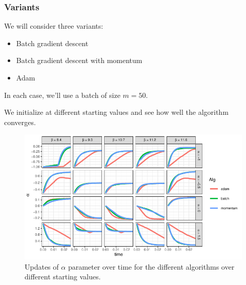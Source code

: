 \documentclass[aspectratio=1610,onlytextwidth]{beamer}
\begin{document}
\begin{frame}[c]
  \frametitle{Variants}
  We will consider three variants:
  \begin{itemize}
    \item Batch gradient descent
    \item Batch gradient descent \alert{with momentum}
    \item Adam
  \end{itemize}

  \bigskip

  In each case, we'll use a batch of size $m=50$.

  \bigskip

  We initialize at different starting values and see how well the algorithm converges.
\end{frame}


\begin{frame}[c]
  \begin{figure}[htpb]
    \centering
    \includegraphics[]{images/nonlinear-alpha.pdf}
    \caption{%
      Updates of \(\alpha\) parameter over time for the different algorithms over
      different starting values.
    }
  \end{figure}

\end{frame}
\end{document}
